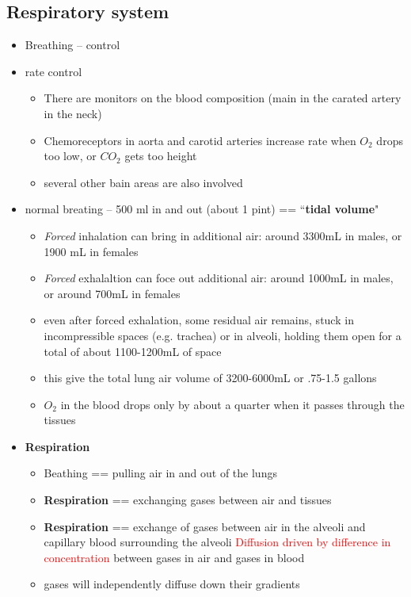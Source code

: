 \documentclass{article}
\theoremstyle{definition}
\begin{document}
\subsection{Respiratory system}
\begin{itemize}
	\item Breathing -- control
	\item rate control
		\begin{itemize}
			\item There are monitors on the blood composition (main in the carated artery in the neck)
			\item Chemoreceptors in aorta and carotid arteries increase rate when $O_2$ drops too low, or $CO_2$ gets too height
			\item several other bain areas are also involved
		\end{itemize}
	\item normal breating -- 500 ml in and out (about 1 pint) == ``\textbf{tidal volume}"
		\begin{itemize}
			\item \textit{Forced}  inhalation can bring in additional air: around 3300mL in males, or 1900 mL in females
			\item \textit{Forced} exhalaltion can foce  out additional air: around 1000mL in males, or around 700mL in females
			\item even after forced exhalation, some residual air remains, stuck in incompressible spaces (e.g. trachea) or in alveoli, holding them open for a total of about 1100-1200mL of space
			\item this give the total lung air volume of 3200-6000mL or .75-1.5 gallons
			\item $O_2$ in the blood drops only by about a quarter when it passes through the tissues
		\end{itemize}
	\item \textbf{Respiration} 
		\begin{itemize}
			\item Beathing == pulling air in and out of the lungs
			\item \textbf{Respiration}  == exchanging gases between air and tissues
			\item \textbf{Respiration}  == exchange of gases between air in the alveoli and capillary blood surrounding the alveoli \textcolor{red}{Diffusion driven by difference in concentration} between gases in air and gases in blood
			\item gases  will independently diffuse down their gradients

\end{itemize}
\end{itemize}
\end{document}
